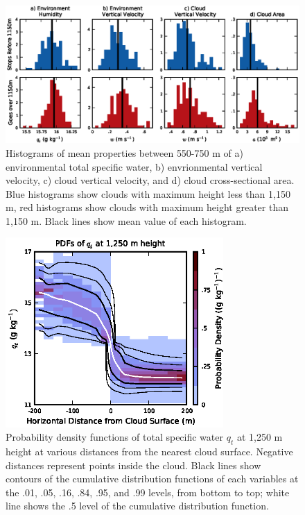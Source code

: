 \documentclass[acp]{copernicus}
\begin{document}
\begin{figure}[t]
\vspace*{2mm}
\begin{center}
\includegraphics[width=\textwidth]{./figures/cloud_environment_histograms}
\end{center}
\caption{Histograms of mean properties between 550-750 m of a) environmental 
total specific water, b) envrionmental vertical velocity, c) cloud vertical 
velocity, and d) cloud cross-sectional area.  Blue histograms show clouds with 
maximum height less than 1,150 m, red histograms show clouds with maximum 
height greater than 1,150 m.  Black lines show mean value of each histogram.}
\label{fig:cloud_environment_histograms}
\end{figure}

\begin{figure}[t]
\vspace*{2mm}
\begin{center}
\includegraphics[width=8.3cm]{./figures/qt_vs_dist}
\end{center}
\caption{Probability density functions of total specific water $q_t$ at 
1,250 m height at various distances from the nearest cloud surface.  Negative
distances represent points inside the cloud.  Black lines show 
contours of the cumulative distribution functions of each variables at the .01, 
.05, .16, .84, .95, and .99 levels, from bottom to top; white line shows the
.5 level of the cumulative distribution function.}
\label{fig:qt_vs_dist}
\end{figure}
\end{document}
